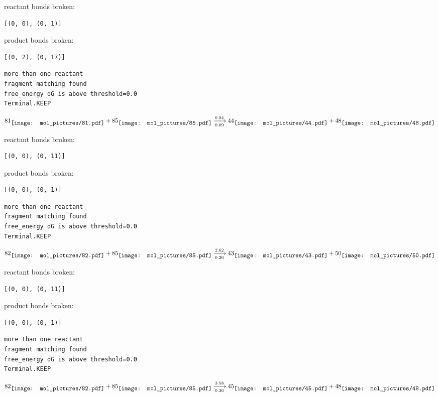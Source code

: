 \documentclass{article}
\begin{document}
reactant bonds broken:\begin{verbatim}
[(0, 0), (0, 1)]
\end{verbatim}
product bonds broken:\begin{verbatim}
[(0, 2), (0, 17)]
\end{verbatim}




\vspace{1cm}
\begin{verbatim}
more than one reactant
fragment matching found
free_energy dG is above threshold=0.0
Terminal.KEEP
\end{verbatim}
$$
81
\raisebox{-.5\height}{\texttt{[image: mol\_pictures/81.pdf]}}
+
85
\raisebox{-.5\height}{\texttt{[image: mol\_pictures/85.pdf]}}
\xrightarrow[0.09]{0.94}
44
\raisebox{-.5\height}{\texttt{[image: mol\_pictures/44.pdf]}}
+
48
\raisebox{-.5\height}{\texttt{[image: mol\_pictures/48.pdf]}}
$$


reactant bonds broken:\begin{verbatim}
[(0, 0), (0, 11)]
\end{verbatim}
product bonds broken:\begin{verbatim}
[(0, 0), (0, 1)]
\end{verbatim}




\vspace{1cm}
\begin{verbatim}
more than one reactant
fragment matching found
free_energy dG is above threshold=0.0
Terminal.KEEP
\end{verbatim}
$$
82
\raisebox{-.5\height}{\texttt{[image: mol\_pictures/82.pdf]}}
+
85
\raisebox{-.5\height}{\texttt{[image: mol\_pictures/85.pdf]}}
\xrightarrow[0.26]{2.62}
43
\raisebox{-.5\height}{\texttt{[image: mol\_pictures/43.pdf]}}
+
50
\raisebox{-.5\height}{\texttt{[image: mol\_pictures/50.pdf]}}
$$


reactant bonds broken:\begin{verbatim}
[(0, 0), (0, 11)]
\end{verbatim}
product bonds broken:\begin{verbatim}
[(0, 0), (0, 1)]
\end{verbatim}




\vspace{1cm}
\begin{verbatim}
more than one reactant
fragment matching found
free_energy dG is above threshold=0.0
Terminal.KEEP
\end{verbatim}
$$
82
\raisebox{-.5\height}{\texttt{[image: mol\_pictures/82.pdf]}}
+
85
\raisebox{-.5\height}{\texttt{[image: mol\_pictures/85.pdf]}}
\xrightarrow[0.36]{3.58}
45
\raisebox{-.5\height}{\texttt{[image: mol\_pictures/45.pdf]}}
+
48
\raisebox{-.5\height}{\texttt{[image: mol\_pictures/48.pdf]}}
$$
\end{document}
